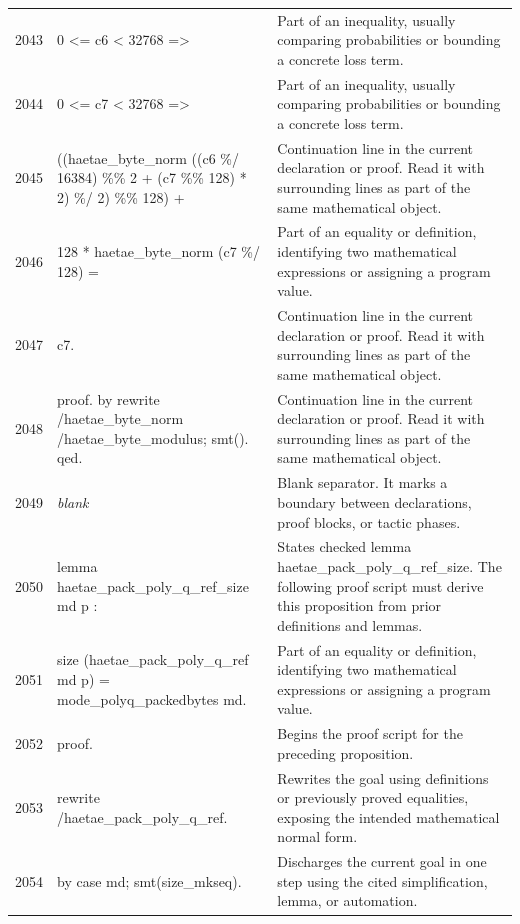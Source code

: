 \documentclass[10pt]{article}
\begin{document}
\begin{longtable}{r L{0.53\textwidth} L{0.37\textwidth}}
2043 & {\ttfamily\scriptsize   0 <= c6 < 32768 =>} & Part of an inequality, usually comparing probabilities or bounding a concrete loss term. \\
2044 & {\ttfamily\scriptsize   0 <= c7 < 32768 =>} & Part of an inequality, usually comparing probabilities or bounding a concrete loss term. \\
2045 & {\ttfamily\scriptsize   ((haetae\_byte\_norm ((c6 \%/ 16384) \%\% 2 + (c7 \%\% 128) * 2) \%/ 2) \%\% 128) +} & Continuation line in the current declaration or proof.  Read it with surrounding lines as part of the same mathematical object. \\
2046 & {\ttfamily\scriptsize     128 * haetae\_byte\_norm (c7 \%/ 128) =} & Part of an equality or definition, identifying two mathematical expressions or assigning a program value. \\
2047 & {\ttfamily\scriptsize   c7.} & Continuation line in the current declaration or proof.  Read it with surrounding lines as part of the same mathematical object. \\
2048 & {\ttfamily\scriptsize proof. by rewrite /haetae\_byte\_norm /haetae\_byte\_modulus; smt(). qed.} & Continuation line in the current declaration or proof.  Read it with surrounding lines as part of the same mathematical object. \\
2049 & {\ttfamily\scriptsize \emph{blank}} & Blank separator.  It marks a boundary between declarations, proof blocks, or tactic phases. \\
2050 & {\ttfamily\scriptsize lemma haetae\_pack\_poly\_q\_ref\_size md p :} & States checked lemma haetae\_pack\_poly\_q\_ref\_size.  The following proof script must derive this proposition from prior definitions and lemmas. \\
2051 & {\ttfamily\scriptsize   size (haetae\_pack\_poly\_q\_ref md p) = mode\_polyq\_packedbytes md.} & Part of an equality or definition, identifying two mathematical expressions or assigning a program value. \\
2052 & {\ttfamily\scriptsize proof.} & Begins the proof script for the preceding proposition. \\
2053 & {\ttfamily\scriptsize rewrite /haetae\_pack\_poly\_q\_ref.} & Rewrites the goal using definitions or previously proved equalities, exposing the intended mathematical normal form. \\
2054 & {\ttfamily\scriptsize by case md; smt(size\_mkseq).} & Discharges the current goal in one step using the cited simplification, lemma, or automation. \\

\end{longtable}
\end{document}
